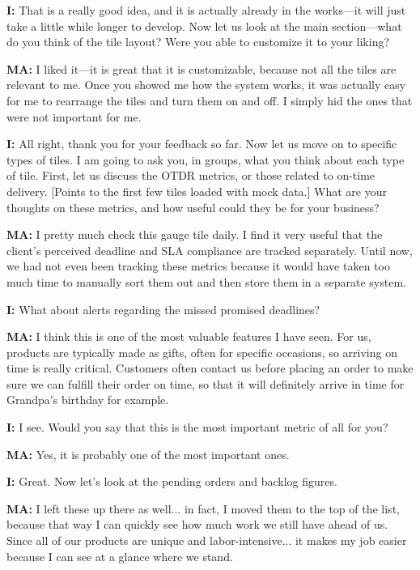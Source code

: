 \documentclass{imc-inf}
\begin{document}
\begin{appendices}
  \noindent\textbf{I:} That is a really good idea, and it is actually already in the works—it will just take a little while longer to develop. Now let us look at the main section—what do you think of the tile layout? Were you able to customize it to your liking?

  \noindent\textbf{MA:} I liked it—it is great that it is customizable, because not all the tiles are relevant to me. Once you showed me how the system works, it was actually easy for me to rearrange the tiles and turn them on and off. I simply hid the ones that were not important for me.

  \noindent\textbf{I:} All right, thank you for your feedback so far. Now let us move on to specific types of tiles. I am going to ask you, in groups, what you think about each type of tile. First, let us discuss the OTDR metrics, or those related to on-time delivery. [Points to the first few tiles loaded with mock data.] What are your thoughts on these metrics, and how useful could they be for your business?

  \noindent\textbf{MA:} I pretty much check this gauge tile daily. I find it very useful that the client's perceived deadline and SLA compliance are tracked separately. Until now, we had not even been tracking these metrics because it would have taken too much time to manually sort them out and then store them in a separate system.

  \noindent\textbf{I:} What about alerts regarding the missed promised deadlines?

  \noindent\textbf{MA:} I think this is one of the most valuable features I have seen. For us, products are typically made as gifts, often for specific occasions, so arriving on time is really critical. Customers often contact us before placing an order to make sure we can fulfill their order on time, so that it will definitely arrive in time for Grandpa's birthday for example.

  \noindent\textbf{I:} I see. Would you say that this is the most important metric of all for you?

  \noindent\textbf{MA:} Yes, it is probably one of the most important ones.

  \noindent\textbf{I:} Great. Now let's look at the pending orders and backlog figures.

  \noindent\textbf{MA:} I left these up there as well... in fact, I moved them to the top of the list, because that way I can quickly see how much work we still have ahead of us. Since all of our products are unique and labor-intensive... it makes my job easier because I can see at a glance where we stand.


\end{appendices}
\end{document}
